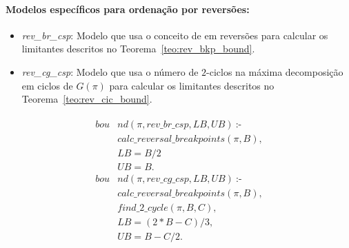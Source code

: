 \paragraph{Modelos específicos para ordenação por reversões:}
\begin{itemize}

    \item{\textit{rev\_br\_csp}: Modelo que usa o conceito de \bkp{} em
        reversões para calcular os limitantes descritos no
        Teorema~\ref{teo:rev_bkp_bound}.}

    \item{\textit{rev\_cg\_csp}: Modelo que usa o número de $2$-ciclos
        na máxima decomposição em ciclos de $G(\pi)$ para calcular os
        limitantes descritos no Teorema~\ref{teo:rev_cic_bound}.}

\end{itemize}
\begin{align}
  \label{bound_rev}
  \begin{split}
  \textit{bou}&\textit{nd}(\pi, rev\_br\_csp, LB, UB)~\text{:-}  \\
  &\textit{calc\_reversal\_breakpoints}(\pi, B), \\
  &LB = B / 2  \\ %
  &UB = B.  \\
  \textit{bou}&\textit{nd}(\pi, rev\_cg\_csp, LB, UB)~\text{:-}  \\
  &\textit{calc\_reversal\_breakpoints}(\pi, B), \\
  &\textit{find\_2\_cycle}(\pi, B, C), \\
  &LB = (2 * B - C) / 3 ,   \\
  &UB = B - C / 2.
  \end{split}
\end{align}

